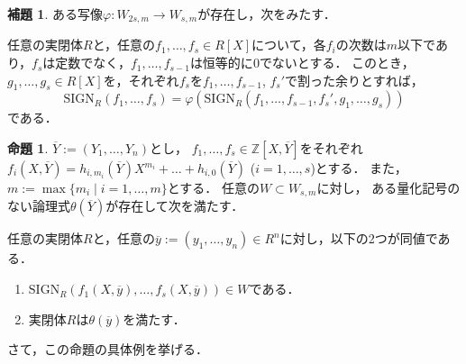\documentclass[uplatex, dvipdfmx]{jsarticle}
\newcommand{\SIGN}{\mathrm{SIGN}}
\newcommand{\Z}{\mathbb{Z}}
\newcommand{\map}[3]{{#1}:{#2}\rightarrow{#3}}
\theoremstyle{definition}
\newtheorem*{proposition*}{命題}
\newtheorem*{lemma*}{補題}
\begin{document}
\begin{lemma*}
    ある写像$\map{\varphi}{W_{2s,m}}{W_{s,m}}$が存在し，次をみたす．

    任意の実閉体$R$と，任意の$f_1, \dots, f_s \in R[X]$について，各$f_i$の次数は$m$以下であり，$f_s$は定数でなく，$f_1, \dots, f_{s-1}$は恒等的に$0$でないとする．
    このとき，$g_1, \dots, g_s \in R[X]$を，それぞれ$f_s$を$f_1, \dots, f_{s-1}$, $f_s'$で割った余りとすれば，
    \begin{equation}
         \SIGN_R(f_1, \dots, f_s) = \varphi(\SIGN_R(f_1, \dots, f_{s-1}, f_s', g_1, \dots, g_s))
    \end{equation}
    である．
\end{lemma*}


\begin{proposition*}
    $\overline{Y}:= (Y_1, \dots, Y_n)$とし，
    $f_1, \dots, f_s \in \Z\left[X, \overline{Y}\right]$をそれぞれ
    $f_i \left(X, \overline{Y} \right) = h_{i, m_i}\left( \overline{Y} \right) X^{m_i} + \dots + h_{i, 0}\left(\overline{Y}\right)$ ($i=1, \dots, s$)とする．
    また，$m:= \max\{m_i \mid i=1, \dots, m\}$とする．
    任意の$W \subset W_{s,m}$に対し，
    ある量化記号のない論理式$\theta\left(\overline{Y}\right)$が存在して次を満たす．

    任意の実閉体$R$と，任意の$\overline{y} := (y_1, \dots, y_n) \in R^n$に対し，以下の2つが同値である．
    \begin{enumerate}
         \item $\SIGN_R(f_1(X, \overline{y}), \dots, f_s(X, \overline{y})) \in W$である．
         \item 実閉体$R$は$\theta(\overline{y})$を満たす．
    \end{enumerate}
\end{proposition*}

さて，この命題の具体例を挙げる．
\end{document}
